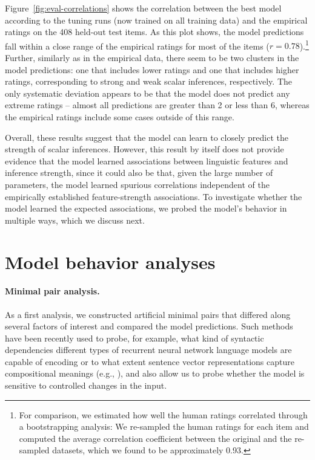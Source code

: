 \documentclass[11pt,a4paper]{article}
\newcommand{\figref}[1]{Figure~\ref{#1}}
\begin{document}
\figref{fig:eval-correlations} shows the correlation between the best model according to the tuning runs (now trained on all training data) and the empirical ratings on the 408 held-out test items. As this plot shows, the model predictions fall within a close range of the empirical ratings for most of the items ($r=0.78$).\footnote{For comparison, we estimated how well the human ratings correlated through a bootstrapping analysis: We re-sampled the human ratings for each item and computed the average correlation coefficient between the original and the re-sampled datasets, which we found to be approximately 0.93.} Further, similarly as in the empirical data, there seem to be two clusters in the model predictions: one that includes lower ratings and one that includes higher ratings, corresponding to strong and weak scalar inferences, respectively. The only systematic deviation appears to be that the model does not predict any extreme ratings -- almost all predictions are greater than 2 or less than 6, whereas the empirical ratings include some cases outside of this range. 

Overall, these results suggest that the model can learn to closely predict the strength of scalar inferences.  However, this result by itself does not provide evidence that the model learned associations between linguistic features and inference strength, since it could also be that, given the large number of parameters, the model learned spurious correlations independent of the empirically established feature-strength associations. To investigate whether the model learned the expected associations, we probed the model's behavior in multiple ways, which we discuss next.

\section{Model behavior analyses}
\label{sec:analyses}


\paragraph{Minimal pair analysis.} As a first analysis, we constructed artificial minimal pairs that differed along 
several factors of interest and compared the model predictions. Such methods have been recently used to probe, for example, what kind of syntactic dependencies different types of recurrent neural network language models are capable of encoding or to what extent sentence vector representations capture compositional meanings (e.g., \citealt{Linzen2016, Gulordava2018, chowdhury2018rnn, Ettinger2018,marvin2018targeted,Futrell2019, Wilcox2019}), and also allow us to probe whether the model is sensitive to controlled changes in the input.
\end{document}
